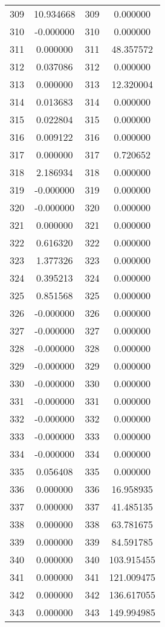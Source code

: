 \documentclass[12pt]{article}
\begin{document}
\begin{longtable}{@{}cccc@{}}
309 & 10.934668 & 309 & 0.000000 \\
310 & -0.000000 & 310 & 0.000000 \\
311 & 0.000000 & 311 & 48.357572 \\
312 & 0.037086 & 312 & 0.000000 \\
313 & 0.000000 & 313 & 12.320004 \\
314 & 0.013683 & 314 & 0.000000 \\
315 & 0.022804 & 315 & 0.000000 \\
316 & 0.009122 & 316 & 0.000000 \\
317 & 0.000000 & 317 & 0.720652 \\
318 & 2.186934 & 318 & 0.000000 \\
319 & -0.000000 & 319 & 0.000000 \\
320 & -0.000000 & 320 & 0.000000 \\
321 & 0.000000 & 321 & 0.000000 \\
322 & 0.616320 & 322 & 0.000000 \\
323 & 1.377326 & 323 & 0.000000 \\
324 & 0.395213 & 324 & 0.000000 \\
325 & 0.851568 & 325 & 0.000000 \\
326 & -0.000000 & 326 & 0.000000 \\
327 & -0.000000 & 327 & 0.000000 \\
328 & -0.000000 & 328 & 0.000000 \\
329 & -0.000000 & 329 & 0.000000 \\
330 & -0.000000 & 330 & 0.000000 \\
331 & -0.000000 & 331 & 0.000000 \\
332 & -0.000000 & 332 & 0.000000 \\
333 & -0.000000 & 333 & 0.000000 \\
334 & -0.000000 & 334 & 0.000000 \\
335 & 0.056408 & 335 & 0.000000 \\
336 & 0.000000 & 336 & 16.958935 \\
337 & 0.000000 & 337 & 41.485135 \\
338 & 0.000000 & 338 & 63.781675 \\
339 & 0.000000 & 339 & 84.591785 \\
340 & 0.000000 & 340 & 103.915455 \\
341 & 0.000000 & 341 & 121.009475 \\
342 & 0.000000 & 342 & 136.617055 \\
343 & 0.000000 & 343 & 149.994985 \\

\end{longtable}
\end{document}
